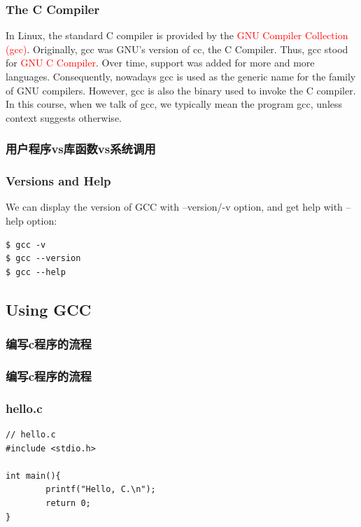 \documentclass{beamer}
\begin{document}
\begin{frame}
\frametitle{The C Compiler}
In Linux, the standard C compiler is provided by the \textcolor{red}{GNU Compiler Collection (gcc)}. Originally, gcc was GNU's version of cc, the C Compiler. Thus, gcc stood for \textcolor{red}{GNU C Compiler}. Over time, support was added for more and more languages. Consequently, nowadays gcc is used as the generic name for the family of GNU compilers. However, gcc is also the binary used to invoke the C compiler. In this course, when we talk of gcc, we typically mean the program gcc, unless context suggests otherwise.

\end{frame}


\begin{frame}
\frametitle{用户程序vs库函数vs系统调用}

\begin{figure}
\end{figure}
\end{frame}
\begin{frame}[fragile]
\frametitle{Versions and Help}
We can display the version of GCC with --version/-v option, and get help with --help option:
\begin{example}
\begin{verbatim}
$ gcc -v
$ gcc --version
$ gcc --help
\end{verbatim}
\end{example}
\end{frame}

\subsection{Using GCC}
\begin{frame}
\frametitle{编写c程序的流程}
\begin{figure}
\end{figure}
\end{frame}
\begin{frame}
\frametitle{编写c程序的流程}
\begin{figure}
\end{figure}
\end{frame}

\begin{frame}[fragile]
\frametitle{hello.c}
\begin{example}
\begin{verbatim}
// hello.c
#include <stdio.h>

int main(){
        printf("Hello, C.\n");
        return 0;
}
\end{verbatim}
\end{example}
\end{frame}
\end{document}
